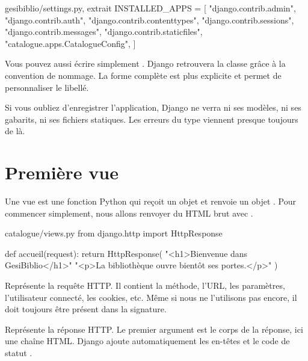 \begin{codebox}[python]{gesibiblio/settings.py, extrait}
INSTALLED_APPS = [
    "django.contrib.admin",
    "django.contrib.auth",
    "django.contrib.contenttypes",
    "django.contrib.sessions",
    "django.contrib.messages",
    "django.contrib.staticfiles",
    "catalogue.apps.CatalogueConfig",
]
\end{codebox}

Vous pouvez aussi écrire simplement . Django retrouvera la
classe  grâce à la convention de nommage. La forme complète
est plus explicite et permet de personnaliser le libellé.

\begin{attention}
Si vous oubliez d'enregistrer l'application, Django ne verra ni ses modèles, ni
ses gabarits, ni ses fichiers statiques. Les erreurs du type  viennent presque toujours de là.
\end{attention}

\section{Première vue}

Une vue est une fonction Python qui reçoit un objet  et renvoie un
objet . Pour commencer simplement, nous allons renvoyer du HTML
brut avec .

\begin{codebox}[python]{catalogue/views.py}
from django.http import HttpResponse


def accueil(request):
    return HttpResponse(
        "<h1>Bienvenue dans GesiBiblio</h1>"
        "<p>La bibliothèque ouvre bientôt ses portes.</p>"
    )
\end{codebox}

\begin{description}[leftmargin=3.1cm,style=nextline]
  \item[\code{request}] Représente la requête HTTP. Il contient la méthode, l'URL,
  les paramètres, l'utilisateur connecté, les cookies, etc. Même si nous ne
  l'utilisons pas encore, il doit toujours être présent dans la signature.
  \item[\code{HttpResponse}] Représente la réponse HTTP. Le premier argument est
  le corps de la réponse, ici une chaîne HTML. Django ajoute automatiquement les
  en-têtes et le code de statut .
\end{description}

